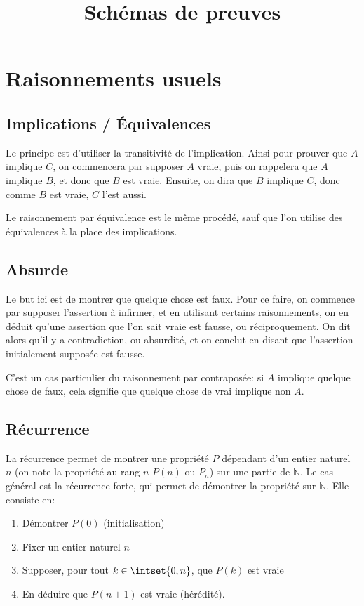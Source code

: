 \documentclass{scrartcl}
\title{Schémas de preuves}
\author{}
\date{}
\begin{document}
	\maketitle
	\section{Raisonnements usuels}
		\subsection{Implications / Équivalences}
			Le principe est d'utiliser la transitivité de l'implication.
			Ainsi pour prouver que $A$ implique $C$, on commencera par supposer $A$ vraie,
			puis on rappelera que $A$ implique $B$, et donc que $B$ est vraie. 
			Ensuite, on dira que $B$ implique $C$, donc comme $B$ est vraie, $C$ l'est aussi.

			Le raisonnement par équivalence est le même procédé, sauf que l'on utilise des équivalences
			à la place des implications.

		\subsection{Absurde}
			Le but ici est de montrer que quelque chose est faux.
			Pour ce faire, on commence par supposer l'assertion à infirmer, 
			et en utilisant certains raisonnements, on en déduit qu'une assertion que l'on sait vraie est fausse,
			ou réciproquement. On dit alors qu'il y a contradiction, ou absurdité,
			et on conclut en disant que l'assertion initialement supposée est fausse.

			\rem C'est un cas particulier du raisonnement par contraposée: si $A$ implique quelque chose de faux,
			cela signifie que quelque chose de vrai implique non $A$. 

		\subsection{Récurrence}
			La récurrence permet de montrer une propriété $P$ dépendant d'un entier naturel $n$ 
			(on note la propriété au rang $n$ $P(n)$ ou $P_n$) 
			sur une partie de $\mathbb{N}$.
			Le cas général est la récurrence forte, 
			qui permet de démontrer la propriété sur $\mathbb{N}$.
			Elle consiste en:
			\begin{enumerate}
				\item Démontrer $P(0)$ (initialisation)
				\item Fixer un entier naturel $n$
				\item Supposer, pour tout $k \in \intset{0,n}$, que $P(k)$ est vraie
				\item En déduire que $P(n+1)$ est vraie (hérédité).
			\end{enumerate}
\end{document}
